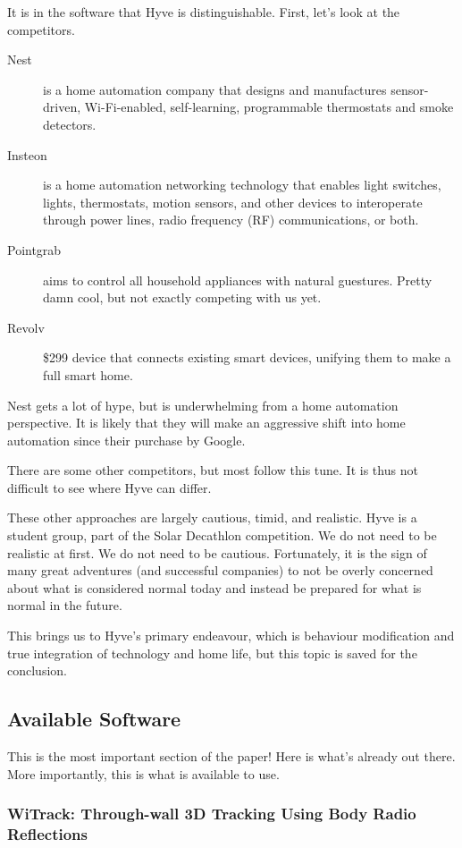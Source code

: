 		It is in the software that Hyve is distinguishable.
		First, let's look at the competitors.
		\begin{description}
			\item[Nest] is a home automation company that designs and manufactures sensor-driven, Wi-Fi-enabled, self-learning, programmable thermostats and smoke detectors.
			\item[Insteon] is a home automation networking technology that enables light switches, lights, thermostats, motion sensors, and other devices to interoperate through power lines, radio frequency (RF) communications, or both.
			\item[Pointgrab] aims to control all household appliances with natural guestures.  Pretty damn cool, but not exactly competing with us yet.
			\item[Revolv] \$299 device that connects existing smart devices, unifying them to make a full smart home.
		\end{description}
		
		Nest gets a lot of hype, but is underwhelming from a home automation perspective.
		It is likely that they will make an aggressive shift into home automation since their purchase by Google.
		
		There are some other competitors, but most follow this tune.
		It is thus not difficult to see where Hyve can differ.
		
		These other approaches are largely cautious, timid, and realistic.
		Hyve is a student group, part of the Solar Decathlon competition.
		We do not need to be realistic at first.
		We do not need to be cautious.
		Fortunately, it is the sign of many great adventures (and successful companies) to not be overly concerned about what is considered normal today and instead be prepared for what is normal in the future.
		
		This brings us to Hyve's primary endeavour, which is behaviour modification and true integration of technology and home life, but this topic is saved for the conclusion.
		
	\subsection{Available Software}
	
		This is the most important section of the paper!
		Here is what's already out there.
		More importantly, this is what is available to use.
		
		\subsubsection{WiTrack: Through-wall 3D Tracking Using Body Radio Reflections}
		
